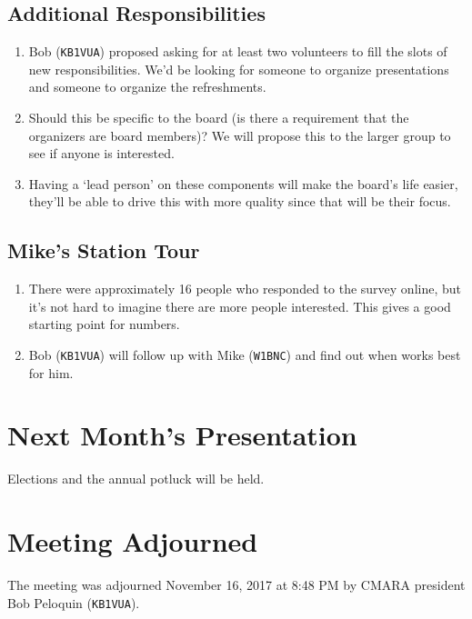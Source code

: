 \documentclass[10pt,letterpaper]{article}
\begin{document}
\subsection{Additional Responsibilities}
\begin{enumerate}
  \item Bob (\texttt{KB1VUA}) proposed asking for at least two volunteers to fill the slots of new responsibilities. We'd be looking for someone to organize presentations and someone to organize the refreshments.
  \item Should this be specific to the board (is there a requirement that the organizers are board members)? We will propose this to the larger group to see if anyone is interested.
  \item Having a `lead person' on these components will make the board's life easier, they'll be able to drive this with more quality since that will be their focus.
\end{enumerate}

\subsection{Mike's Station Tour}
\begin{enumerate}
  \item There were approximately 16 people who responded to the survey online, but it's not hard to imagine there are more people interested. This gives a good starting point for numbers.
  \item Bob (\texttt{KB1VUA}) will follow up with Mike (\texttt{W1BNC}) and find out when works best for him.
\end{enumerate}

\section{Next Month's Presentation}
Elections and the annual potluck will be held.

\section{Meeting Adjourned}
The meeting was adjourned November 16, 2017 at 8:48 PM by CMARA president Bob Peloquin (\texttt{KB1VUA}).
\end{document}

